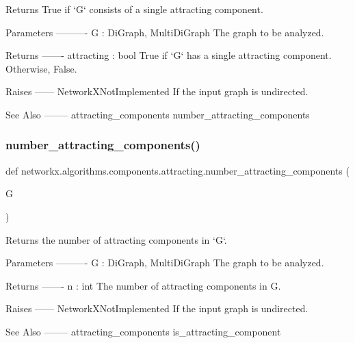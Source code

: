 \begin{DoxyVerb}Returns True if `G` consists of a single attracting component.

Parameters
----------
G : DiGraph, MultiDiGraph
    The graph to be analyzed.

Returns
-------
attracting : bool
    True if `G` has a single attracting component. Otherwise, False.

Raises
------
NetworkXNotImplemented
    If the input graph is undirected.

See Also
--------
attracting_components
number_attracting_components\end{DoxyVerb}
 \mbox{\label{namespacenetworkx_1_1algorithms_1_1components_1_1attracting_a7cacb51a9a3367f342f1adb8ce1e6ce3}} 
\subsubsection{\texorpdfstring{number\+\_\+attracting\+\_\+components()}{number\_attracting\_components()}}
{\footnotesize\ttfamily def networkx.\+algorithms.\+components.\+attracting.\+number\+\_\+attracting\+\_\+components (\begin{DoxyParamCaption}\item[{}]{G }\end{DoxyParamCaption})}

\begin{DoxyVerb}Returns the number of attracting components in `G`.

Parameters
----------
G : DiGraph, MultiDiGraph
    The graph to be analyzed.

Returns
-------
n : int
    The number of attracting components in G.

Raises
------
NetworkXNotImplemented
    If the input graph is undirected.

See Also
--------
attracting_components
is_attracting_component\end{DoxyVerb}
 